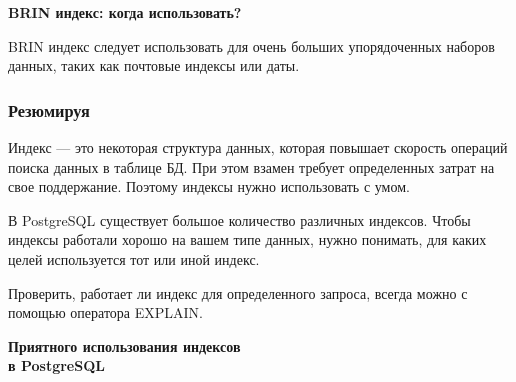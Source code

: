\documentclass[aspectratio=169]{beamer}
\begin{document}
\begin{frame}
  \vspace*{1em}
  \begin{center}
    {\LARGE \textbf{BRIN индекс: когда использовать?}}

    \vspace*{1em}

    BRIN индекс следует использовать для очень больших упорядоченных наборов
    данных, таких как почтовые индексы или даты.
  \end{center}
\end{frame}

\begin{frame}
  \frametitle{Резюмируя}

  Индекс --- это некоторая структура данных, которая повышает скорость операций
  поиска данных в таблице БД. При этом взамен требует определенных затрат на
  свое поддержание. Поэтому индексы нужно использовать с умом.

  \vspace*{1em}

  В PostgreSQL существует большое количество различных индексов. Чтобы индексы
  работали хорошо на вашем типе данных, нужно понимать, для каких целей
  используется тот или иной индекс.

  \vspace*{1em}

  Проверить, работает ли индекс для определенного запроса, всегда можно с
  помощью оператора EXPLAIN.
\end{frame}

\begin{frame}
  \vspace*{1em}
  \begin{center}
    {\huge \textbf{Приятного использования индексов \\ в PostgreSQL}}
  \end{center}
\end{frame}
\end{document}

